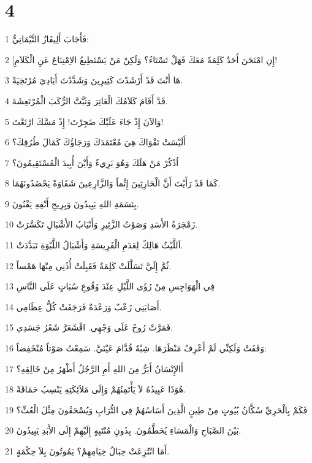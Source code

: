 \chapter{4}

\par 1 فَأَجَابَ أَلِيفَازُ التَّيْمَانِيُّ:
\par 2 [إِنِ امْتَحَنَ أَحَدٌ كَلِمَةً مَعَكَ فَهَلْ تَسْتَاءُ؟ وَلَكِنْ مَنْ يَسْتَطِيعُ الاِمْتِنَاعَ عَنِ الْكَلاَمِ!
\par 3 هَا أَنْتَ قَدْ أَرْشَدْتَ كَثِيرِينَ وَشَدَّدْتَ أَيَادِيَ مُرْتَخِيَةً.
\par 4 قَدْ أَقَامَ كَلاَمُكَ الْعَاثِرَ وَثَبَّتَّ الرُّكَبَ الْمُرْتَعِشَةَ.
\par 5 وَالآنَ إِذْ جَاءَ عَلَيْكَ ضَجِرْتَ! إِذْ مَسَّكَ ارْتَعْتَ!
\par 6 أَلَيْسَتْ تَقْوَاكَ هِيَ مُعْتَمَدَكَ وَرَجَاؤُكَ كَمَالَ طُرُقِكَ؟
\par 7 اُذْكُرْ مَنْ هَلَكَ وَهُوَ بَرِيءٌ وَأَيْنَ أُبِيدَ الْمُسْتَقِيمُونَ؟
\par 8 كَمَا قَدْ رَأَيْتَ أَنَّ الْحَارِثِينَ إِثْماً وَالزَّارِعِينَ شَقَاوَةً يَحْصُدُونَهُمَا.
\par 9 بِنَسَمَةِ اللهِ يَبِيدُونَ وَبِرِيحِ أَنْفِهِ يَفْنُونَ.
\par 10 زَمْجَرَةُ الأَسَدِ وَصَوْتُ الزَّئِيرِ وَأَنْيَابُ الأَشْبَالِ تَكَسَّرَتْ.
\par 11 اَللَّيْثُ هَالِكٌ لِعَدَمِ الْفَرِيسَةِ وَأَشْبَالُ اللَّبْوَةِ تَبَدَّدَتْ.
\par 12 ثُمَّ إِلَيَّ تَسَلَّلَتْ كَلِمَةٌ فَقَبِلَتْ أُذُنِي مِنْهَا هَمْساً.
\par 13 فِي الْهَوَاجِسِ مِنْ رُؤَى اللَّيْلِ عِنْدَ وُقُوعِ سُبَاتٍ عَلَى النَّاسِ
\par 14 أَصَابَنِي رُعْبٌ وَرَعْدَةٌ فَرَجَفَتْ كُلُّ عِظَامِي.
\par 15 فَمَرَّتْ رُوحٌ عَلَى وَجْهِي. اقْشَعَرَّ شَعْرُ جَسَدِي.
\par 16 وَقَفَتْ وَلَكِنِّي لَمْ أَعْرِفْ مَنْظَرَهَا. شِبْهٌ قُدَّامَ عَيْنَيَّ. سَمِعْتُ صَوْتاً مُنْخَفِضاً:
\par 17 أَالإِنْسَانُ أَبَرُّ مِنَ اللهِ أَمِ الرَّجُلُ أَطْهَرُ مِنْ خَالِقِهِ؟
\par 18 هُوَذَا عَبِيدُهُ لاَ يَأْتَمِنُهُمْ وَإِلَى مَلاَئِكَتِهِ يَنْسِبُ حَمَاقَةً.
\par 19 فَكَمْ بِالْحَرِيِّ سُكَّانُ بُيُوتٍ مِنْ طِينٍ الَّذِينَ أَسَاسُهُمْ فِي التُّرَابِ وَيُسْحَقُونَ مِثْلَ الْعُثِّ؟
\par 20 بَيْنَ الصَّبَاحِ وَالْمَسَاءِ يُحَطَّمُونَ. بِدُونِ مُنْتَبِهٍ إِلَيْهِمْ إِلَى الأَبَدِ يَبِيدُونَ.
\par 21 أَمَا انْتُزِعَتْ حِبَالُ خِيَامِهِمْ؟ يَمُوتُونَ بِلاَ حِكْمَةٍ.

